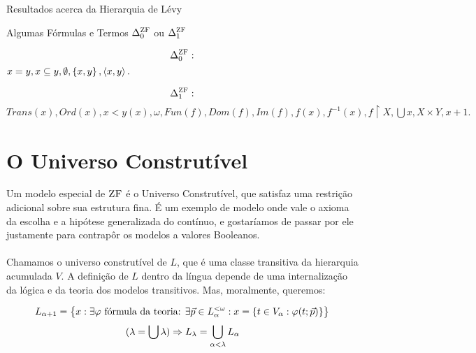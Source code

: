 \begin{theorem}{Resultados acerca da Hierarquia de Lévy}
\begin{lemma}{Algumas Fórmulas e Termos $\Delta^{\text{\sc ZF}}_{0}$ ou $\Delta^{\text{\sc ZF}}_{1}$}
{                        $$\Delta^{\text{\sc ZF}}_{0}:$$ 
                        $
                            x = y           ,
                            x \subseteq y   ,
                            \emptyset       ,
                            \SET{x}{y}      ,
                            \TUPLE{x}{y}    .
                        $
                        
                        } {
                        
                        $$\Delta^{\text{\sc ZF}}_{1}:$$ $   
                            Trans(x)        ,
                            Ord(x)          ,
                            x<y(x)          ,
                            \omega          ,
                            Fun(f)          ,
                            Dom(f)          ,
                            Im(f)           ,
                            f(x)            ,
                            f^{-1}(x)       ,
                            f\restriction X ,
                            \bigcup x       ,
                            X\times Y       ,
                            x+1             .
                        $
                        
                        }
                    \end{lemma}
                \end{theorem}
    \section{O Universo Construtível}
            Um modelo especial de $\text{\sc ZF}$ é o Universo Construtível, que satisfaz uma restrição adicional sobre sua estrutura fina. É um exemplo 
            de modelo onde vale o axioma da escolha e a hipótese generalizada do contínuo, e gostaríamos de passar por ele justamente para 
            contrapôr os modelos a valores Booleanos.
        \paragraph{}
            Chamamos o universo construtível de $L$, que é uma classe transitiva da hierarquia acumulada $V$. A definição de $L$ dentro da 
            língua depende de uma internalização da lógica e da teoria dos modelos transitivos. Mas, moralmente, queremos:

        $$ L_{\alpha+1} = \SET{x : \exists \varphi \text { fórmula da teoria: }\exists \vec{p} \in L_\alpha^{<\omega}: x = \SET{t\in V_\alpha : \varphi(t; \vec{p})}} $$
        $$ (\lambda = \bigcup \lambda) \Rightarrow L_\lambda = \bigcup_{\alpha<\lambda}L_\alpha $$

